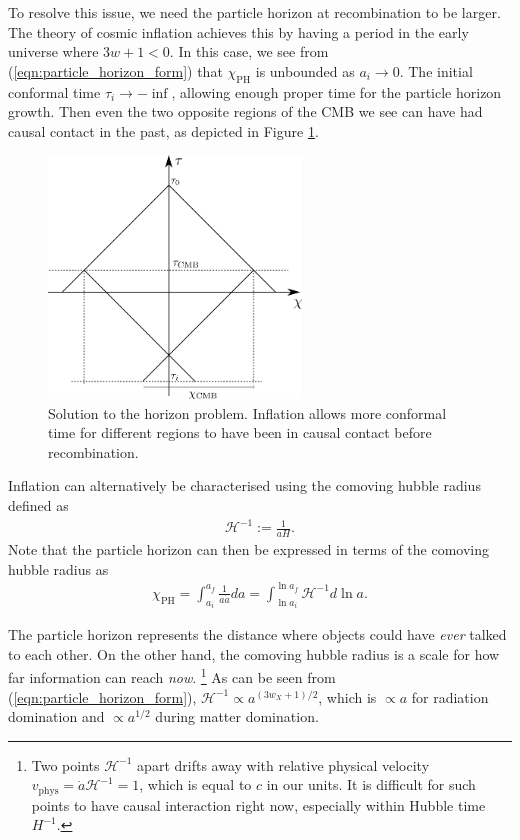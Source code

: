To resolve this issue, we need the particle horizon at recombination to be larger. The theory of cosmic inflation achieves this by having a period in the early universe where $3w+1<0$. In this case, we see from (\ref{eqn:particle_horizon_form}) that $\chi_\text{PH}$ is unbounded as $a_i \rightarrow 0$. The initial conformal time $\tau_i \rightarrow -\inf$, allowing enough proper time for the particle horizon growth. Then even the two opposite regions of the CMB we see can have had causal contact in the past, as depicted in Figure \ref{fig:horizon_solution}.
\begin{figure}[htbp!] 
	\centering    
	\includegraphics[width=0.6\textwidth]{horizon_solution.png}
	\caption[Horizon problem]{Solution to the horizon problem. Inflation allows more conformal time for different regions to have been in causal contact before recombination.}
	\label{fig:horizon_solution}
\end{figure}

Inflation can alternatively be characterised using the comoving hubble radius defined as
\begin{align}
	\mathcal{H}^{-1} := \frac{1}{aH}.
\end{align}
Note that the particle horizon can then be expressed in terms of the comoving hubble radius as
\begin{align}
	\chi_\text{PH} = \int_{a_i}^{a_f} \frac{1}{a \dot{a}} da = \int_{\ln a_i}^{\ln a_f} \mathcal{H}^{-1} d\ln a. \label{eqn:particle_horizon_comoving_hubble}
\end{align}

The particle horizon represents the distance where objects could have \textit{ever} talked to each other. On the other hand, the comoving hubble radius is a scale for how far information can reach \textit{now}. \footnote{Two points $\mathcal{H}^{-1}$ apart drifts away with relative physical velocity $v_\text{phys} = \dot{a} \mathcal{H}^{-1} = 1$, which is equal to $c$ in our units. It is difficult for such points to have causal interaction right now, especially within Hubble time $H^{-1}$.} As can be seen from (\ref{eqn:particle_horizon_form}), $\mathcal{H}^{-1} \propto a^{(3w_X+1)/2}$, which is $\propto a$ for radiation domination and $\propto a^{1/2}$ during matter domination.

